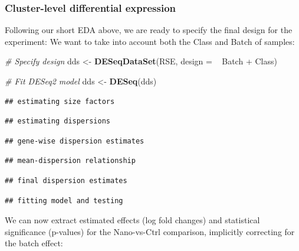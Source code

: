 \documentclass[9pt,a4paper,]{extarticle}
\newenvironment{Shaded}{\begin{snugshade}}{\end{snugshade}}
\newcommand{\KeywordTok}[1]{\textcolor[rgb]{0.13,0.29,0.53}{\textbf{{#1}}}}
\newcommand{\DataTypeTok}[1]{\textcolor[rgb]{0.13,0.29,0.53}{{#1}}}
\newcommand{\StringTok}[1]{\textcolor[rgb]{0.31,0.60,0.02}{{#1}}}
\newcommand{\CommentTok}[1]{\textcolor[rgb]{0.56,0.35,0.01}{\textit{{#1}}}}
\newcommand{\NormalTok}[1]{{#1}}
\begin{document}
\subsubsection{Cluster-level differential expression}\label{cluster-level-differential-expression}

Following our short EDA above, we are ready to specify the final design for the experiment: We want to take into account both the Class and Batch of samples:

\begin{Shaded}
\begin{Highlighting}[]
\CommentTok{# Specify design}
\NormalTok{dds <-}\StringTok{ }\KeywordTok{DESeqDataSet}\NormalTok{(RSE, }\DataTypeTok{design =} \NormalTok{~}\StringTok{ }\NormalTok{Batch +}\StringTok{ }\NormalTok{Class)}

\CommentTok{# Fit DESeq2 model}
\NormalTok{dds <-}\StringTok{ }\KeywordTok{DESeq}\NormalTok{(dds)}
\end{Highlighting}
\end{Shaded}

\begin{verbatim}
## estimating size factors
\end{verbatim}

\begin{verbatim}
## estimating dispersions
\end{verbatim}

\begin{verbatim}
## gene-wise dispersion estimates
\end{verbatim}

\begin{verbatim}
## mean-dispersion relationship
\end{verbatim}

\begin{verbatim}
## final dispersion estimates
\end{verbatim}

\begin{verbatim}
## fitting model and testing
\end{verbatim}

We can now extract estimated effects (log fold changes) and statistical significance (p-values) for the Nano-vs-Ctrl comparison, implicitly correcting for the batch effect:
\end{document}
